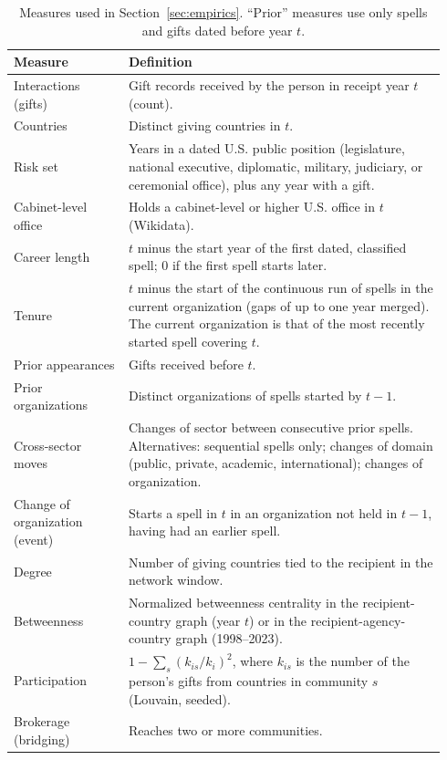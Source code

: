 \documentclass[11pt]{article}
\begin{document}
\begin{table}[ht]
\centering\footnotesize
\caption{Measures used in Section~\ref{sec:empirics}. ``Prior'' measures use only spells and gifts dated before year $t$.}\label{tab:rev_vars}
\begin{tabular}{>{\raggedright\arraybackslash}p{0.25\linewidth}>{\raggedright\arraybackslash}p{0.69\linewidth}}
\toprule
Measure & Definition \\
\midrule
Interactions (gifts) & Gift records received by the person in receipt year $t$ (count). \\
Countries & Distinct giving countries in $t$. \\
Risk set & Years in a dated U.S. public position (legislature, national executive, diplomatic, military, judiciary, or ceremonial office), plus any year with a gift. \\
Cabinet-level office & Holds a cabinet-level or higher U.S. office in $t$ (Wikidata). \\
Career length & $t$ minus the start year of the first dated, classified spell; 0 if the first spell starts later. \\
Tenure & $t$ minus the start of the continuous run of spells in the current organization (gaps of up to one year merged). The current organization is that of the most recently started spell covering $t$. \\
Prior appearances & Gifts received before $t$. \\
Prior organizations & Distinct organizations of spells started by $t-1$. \\
Cross-sector moves & Changes of sector between consecutive prior spells. Alternatives: sequential spells only; changes of domain (public, private, academic, international); changes of organization. \\
Change of organization (event) & Starts a spell in $t$ in an organization not held in $t-1$, having had an earlier spell. \\
Degree & Number of giving countries tied to the recipient in the network window. \\
Betweenness & Normalized betweenness centrality in the recipient-country graph (year $t$) or in the recipient-agency-country graph (1998--2023). \\
Participation & $1-\sum_s (k_{is}/k_i)^2$, where $k_{is}$ is the number of the person's gifts from countries in community $s$ (Louvain, seeded). \\
Brokerage (bridging) & Reaches two or more communities. \\

\end{tabular}
\end{table}
\end{document}
